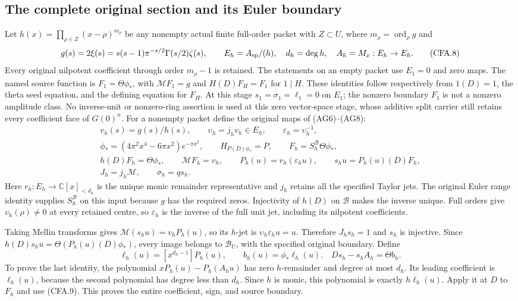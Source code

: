 \subsection{The complete original section and its Euler boundary}

Let $h(x)=\prod_{\rho\in Z}(x-\rho)^{m_\rho}$ be any nonempty actual
finite full-order packet with $Z\subset U$, where
$m_\rho=\operatorname{ord}_\rho g$ and
\[
 g(s)=2\xi(s)=s(s-1)\pi^{-s/2}\Gamma(s/2)\zeta(s),\qquad
 E_h=A_{\rm sp}/(h),\quad d_h=\deg h,
 \quad A_h=M_x:E_h\to E_h.                                  \tag{CFA.8}
\]
Every original nilpotent coefficient through order $m_\rho-1$ is
retained.  The statements on an empty packet use $E_1=0$ and zero maps.
The named source function is $F_1=\Theta\phi_*$, with
$\mathcal MF_1=g$ and $H(D)F_H=F_1$ for $1\mid H$.
These identities follow respectively from $1(D)=1$, the theta
seed equation, and the defining equation for $F_H$. At this stage
$s_1=\sigma_1=\ell_1=0$ on $E_1$; the nonzero boundary $F_1$
is not a nonzero amplitude class. No inverse-unit or nonzero-ring
assertion is used at this zero vector-space stage, whose additive
split carrier still retains every coefficient face of $G(0)^n$.
For a nonempty packet define the original maps of (AG6)--(AG8):
\[
\begin{gathered}
 v_h(s)=g(s)/h(s),\qquad \upsilon_h=j_hv_h\in E_h,
 \qquad\varepsilon_h=\upsilon_h^{-1},\\
 \phi_*=(4\pi^2x^4-6\pi x^2)e^{-\pi x^2},\qquad
 H_{P(D)\phi_*}=P,\qquad F_h=S_h^{\mathscr B}\Theta\phi_*,\\
 h(D)F_h=\Theta\phi_*,\qquad \mathcal MF_h=v_h,\qquad
 P_h(u)=r_h(\varepsilon_hu),\qquad s_hu=P_h(u)(D)F_h,\\
 J_h=j_h\mathcal M,\qquad \sigma_h=q s_h.
\end{gathered}                                                 \tag{CFA.9}
\]
Here $r_h:E_h\to\mathbb C[x]_{<d_h}$ is the unique monic remainder
representative and $j_h$ retains all the specified Taylor jets.
The original Euler range identity supplies $S_h^{\mathscr B}$ on
this input because $g$ has the required zeros.  Injectivity of $h(D)$
on $\mathscr B$ makes the inverse unique.  Full orders give
$v_h(\rho)\ne0$ at every retained centre, so $\varepsilon_h$ is the
inverse of the full unit jet, including its nilpotent coefficients.

Taking Mellin transforms gives
$\mathcal M(s_hu)=v_h P_h(u)$, so its $h$-jet is
$\upsilon_h\varepsilon_hu=u$.  Therefore $J_hs_h=1$ and $s_h$ is
injective.  Since $h(D)s_hu=\Theta(P_h(u)(D)\phi_*)$, every image
belongs to $\mathscr B_U$, with the specified original boundary.
Define
\[
 \ell_h(u)=[x^{d_h-1}]P_h(u),\qquad b_h(u)=\phi_*\ell_h(u).
 \quad
 Ds_h-s_hA_h=\Theta b_h.                                    \tag{CFA.10}
\]
To prove the last identity, the polynomial
$xP_h(u)-P_h(A_hu)$ has zero $h$-remainder and degree at most $d_h$.
Its leading coefficient is $\ell_h(u)$, because the second polynomial
has degree less than $d_h$.  Since $h$ is monic, this polynomial is
exactly $h\ell_h(u)$.  Apply it at $D$ to $F_h$ and use (CFA.9).
This proves the entire coefficient, sign, and source boundary.

